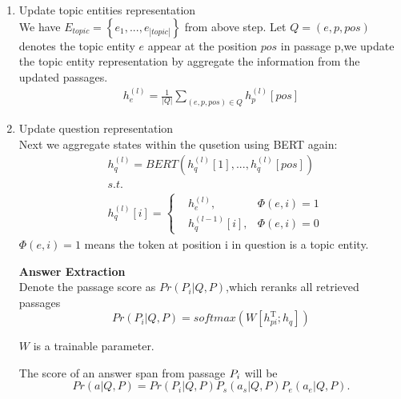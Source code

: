 \documentclass[sigconf]{acmart}
\begin{document}
\begin{enumerate}[(1)]
		\item Update topic entities representation\\
		We have $E_{topic}=\left\{e_1,...,e_{|topic|}\right\}$ from above step. 
		Let $Q = \left(e,p,pos\right)$ denotes the topic entity $e$ appear at the position $pos$ in passage p,we update the topic entity representation by aggregate the information from the updated passages.
		\begin{displaymath}
			\begin{aligned}
				h^{(l)}_{e} = \frac{1}{|Q|}\sum\limits_{(e,p,pos) \in Q} h_p^{(l)}[pos]
			\end{aligned}
		\end{displaymath}
		
		\item Update question representation\\
		Next we aggregate states within the qusetion using BERT again:
		\begin{displaymath}
			\begin{aligned}
				&h_{q}^{(l)} = BERT(h_q^{(l)}[1],...,h_q^{(l)}[pos])\\
				&s.t.\\
				&h_q^{(l)}[i] = \left\{
				\begin{aligned}
					&h^{(l)}_{e}  		 , & {\Phi(e,i) = 1} \\
					&h_q^{(l-1)}[i]     ,& { \Phi(e,i) = 0 }
				\end{aligned}
				\right.
			\end{aligned}
		\end{displaymath}
		$\Phi(e,i)=1$ means the token at position i in question  is a topic entity.
		
		
		
		\textbf{ Answer Extraction }\\		
		Denote the passage score as $Pr(P_i|Q, P)$,which reranks all retrieved passages
		\begin{displaymath}
			Pr(P_i|Q, P) = softmax( W[h_{pi}^\mathrm{ T };h_q] )
		\end{displaymath}
		
		$W$ is a trainable parameter.
		
		The score of an answer span from passage $\MakeUppercase{p}_i$ will be
		\begin{displaymath}
			Pr(a| Q, P) = 	Pr(P_i|Q, P)P_s(a_s|Q, P)P_e(a_e|Q, P).
		\end{displaymath}
		
	\end{enumerate} 
\end{document}
